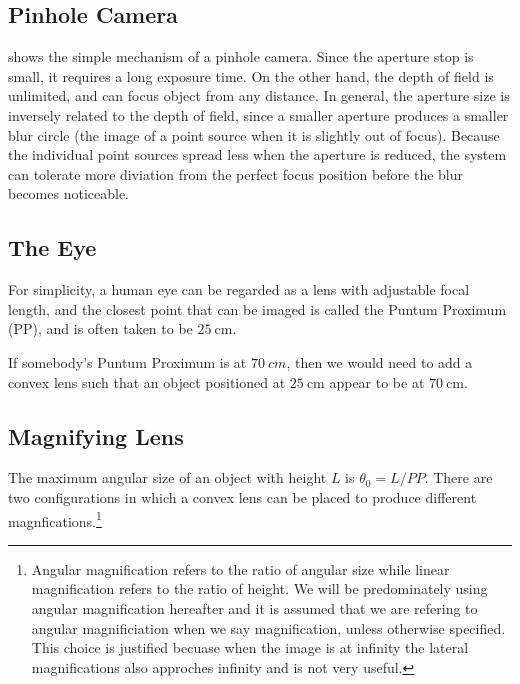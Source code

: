 \documentclass[english,a4paper,12pt]{report}
\begin{document}


\subsection{Pinhole Camera}

 shows the simple mechanism of a pinhole camera. Since the aperture stop is small, it requires a long exposure time. On the other hand, the depth of field is unlimited, and can focus object from any distance. In general, the aperture size is inversely related to the depth of field, since a smaller aperture produces a smaller blur circle (the image of a point source when it is slightly out of focus). Because the individual point sources spread less when the aperture is reduced, the system can tolerate more diviation from the perfect focus position before the blur becomes noticeable. 


\subsection{The Eye}

For simplicity, a human eye can be regarded as a lens with adjustable focal length, and the closest point that can be imaged is called the Puntum Proximum (PP), and is often taken to be \(\SI{25}{\cm} \).  

If somebody's Puntum Proximum is at \(\SI{70}{cm}\), then we would need to add a convex lens such that an object positioned at \(\SI{25}{\cm} \) appear to be at \(\SI{70}{\cm} \).

\subsection{Magnifying Lens}

The maximum angular size of an object with height \(L\) is \(\theta _{0} = L /PP\). There are two configurations in which a convex lens can be placed to produce different magnfications.\footnote{Angular magnification refers to the ratio of angular size while linear magnification refers to the ratio of height. We will be predominately using angular magnification hereafter and it is assumed that we are refering to angular magnificiation when we say magnification, unless otherwise specified. This choice is justified becuase when the image is at infinity the lateral magnifications also approches infinity and is not very useful.} 
\end{document}
